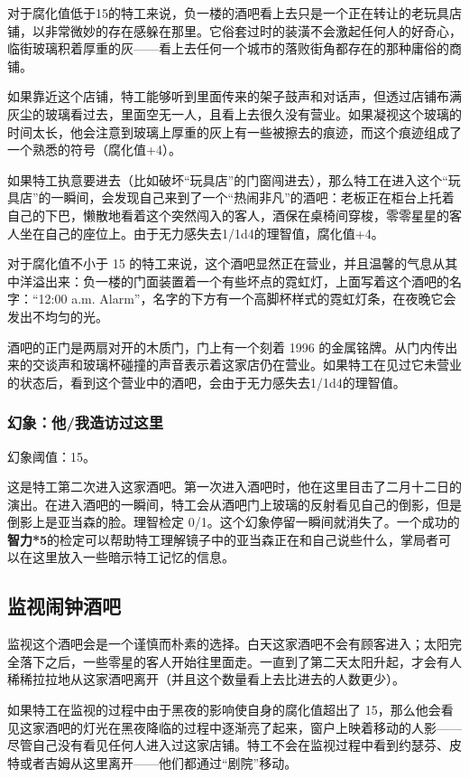 对于腐化值低于15的特工来说，负一楼的酒吧看上去只是一个正在转让的老玩具店铺，以非常微妙的存在感躲在那里。它俗套过时的装潢不会激起任何人的好奇心，临街玻璃积着厚重的灰——看上去任何一个城市的落败街角都存在的那种庸俗的商铺。

如果靠近这个店铺，特工能够听到里面传来的架子鼓声和对话声，但透过店铺布满灰尘的玻璃看过去，里面空无一人，且看上去很久没有营业。如果凝视这个玻璃的时间太长，他会注意到玻璃上厚重的灰上有一些被擦去的痕迹，而这个痕迹组成了一个熟悉的符号（腐化值+4）。

如果特工执意要进去（比如破坏“玩具店”的门窗闯进去），那么特工在进入这个“玩具店”的一瞬间，会发现自己来到了一个“热闹非凡”的酒吧：老板正在柜台上托着自己的下巴，懒散地看着这个突然闯入的客人，酒保在桌椅间穿梭，零零星星的客人坐在自己的座位上。由于无力感失去1/1d4的理智值，腐化值+4。

对于腐化值不小于 15 的特工来说，这个酒吧显然正在营业，并且温馨的气息从其中洋溢出来：负一楼的门面装置着一个有些坏点的霓虹灯，上面写着这个酒吧的名字：“12:00 a.m. Alarm”，名字的下方有一个高脚杯样式的霓虹灯条，在夜晚它会发出不均匀的光。

酒吧的正门是两扇对开的木质门，门上有一个刻着 1996 的金属铭牌。从门内传出来的交谈声和玻璃杯碰撞的声音表示着这家店仍在营业。如果特工在见过它未营业的状态后，看到这个营业中的酒吧，会由于无力感失去1/1d4的理智值。

\subsubsection{幻象：他/我造访过这里}
幻象阈值：15。

这是特工第二次进入这家酒吧。第一次进入酒吧时，他在这里目击了二月十二日的演出。在进入酒吧的一瞬间，特工会从酒吧门上玻璃的反射看见自己的倒影，但是倒影上是亚当森的脸。理智检定 0/1。这个幻象停留一瞬间就消失了。一个成功的\textbf{智力*5}的检定可以帮助特工理解镜子中的亚当森正在和自己说些什么，掌局者可以在这里放入一些暗示特工记忆的信息。

\subsection{监视闹钟酒吧}
监视这个酒吧会是一个谨慎而朴素的选择。白天这家酒吧不会有顾客进入；太阳完全落下之后，一些零星的客人开始往里面走。一直到了第二天太阳升起，才会有人稀稀拉拉地从这家酒吧离开（并且这个数量看上去比进去的人数更少）。

如果特工在监视的过程中由于黑夜的影响使自身的腐化值超出了 15，那么他会看见这家酒吧的灯光在黑夜降临的过程中逐渐亮了起来，窗户上映着移动的人影——尽管自己没有看见任何人进入过这家店铺。特工不会在监视过程中看到约瑟芬、皮特或者吉姆从这里离开——他们都通过“剧院”移动。

